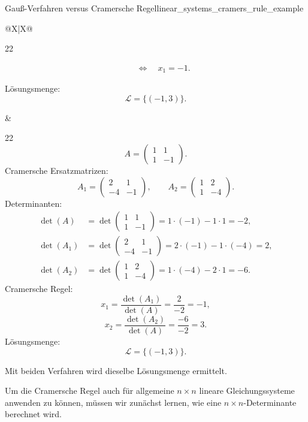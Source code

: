 \begin{ExampleBox}{Gauß-Verfahren versus Cramersche Regel}{linear_systems_cramers_rule_example}
{\begin{tabularx}{\linewidth}{@{}X|X@{}}
\begin{minipage}[t]{\linewidth}
\begin{ClozeArea}[16]{22}
\begin{itemize}[leftmargin=1.4em,itemsep=0.3em,topsep=0.2em]
\[\begin{aligned}
              &\quad\Longleftrightarrow\quad x_1=-1.
            \end{aligned}
          \]
      \end{itemize}
      Lösungsmenge:
      \[
        \mathcal L=\{(-1,3)\}.
      \]
    \end{ClozeArea}
  \end{minipage}
  &
  \begin{minipage}[t]{\linewidth}
    \vspace{0.45em}
    \begin{ClozeArea}[16]{22}
      \[
        A=\begin{pmatrix}1&1\\1&-1\end{pmatrix}.
      \]
      Cramersche Ersatzmatrizen:
      \[
        A_1=\begin{pmatrix}2&1\\-4&-1\end{pmatrix},
        \qquad
        A_2=\begin{pmatrix}1&2\\1&-4\end{pmatrix}.
      \]
      Determinanten:
      \[
        \begin{aligned}
          \det(A)
            &=\det\!\begin{pmatrix}1&1\\1&-1\end{pmatrix}
              =1\cdot(-1)-1\cdot1=-2,\\[0.8em]
          \det(A_1)
            &=\det\!\begin{pmatrix}2&1\\-4&-1\end{pmatrix}
              =2\cdot(-1)-1\cdot(-4)=2,\\[0.8em]
          \det(A_2)
            &=\det\!\begin{pmatrix}1&2\\1&-4\end{pmatrix}
              =1\cdot(-4)-2\cdot1=-6.
        \end{aligned}
      \]
      Cramersche Regel:
      \[
        x_1=\frac{\det(A_1)}{\det(A)}
        =\frac{2}{-2}=-1,
      \]
      \[
        x_2=\frac{\det(A_2)}{\det(A)}
        =\frac{-6}{-2}=3.
      \]
      Lösungsmenge:
      \[
        \mathcal L=\{(-1,3)\}.
      \]
    \end{ClozeArea}
  \end{minipage}
  \end{tabularx}}
  \par\smallskip
  Mit beiden Verfahren wird dieselbe Lösungsmenge ermittelt.
\end{ExampleBox}

Um die Cramersche Regel auch für allgemeine $n \times n$ lineare Gleichungssysteme
anwenden zu können, müssen wir zunächst lernen, wie eine $n \times n$-Determinante
berechnet wird.
